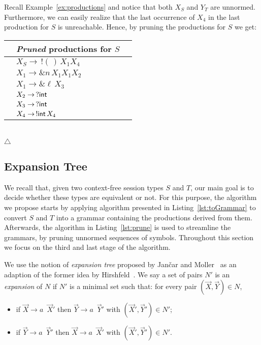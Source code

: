 \begin{example}
\label{ex:prune}
	Recall Example~\ref{ex:productions} and notice that both $X_S$ and $Y_T$ 
	are unnormed. Furthermore, we can easily realize that the last occurrence of 
	$X_4$ in the last production for $S$ is unreachable. Hence, by pruning the 
	productions for $S$ we get:\\
	
	\centering
	\begin{tabular}{l l l }
 		&\emph{Pruned} productions for $S$&  \\ \hline
 		&\hspace*{4mm}$X_S \rightarrow \,! (\,)\,X_1 X_4$ &\\
  		&\hspace*{4mm}$X_1 \rightarrow \& n\, X_1 X_1 X_2$ & \\
  		&\hspace*{4mm}$X_1 \rightarrow \& \ell\, X_3$ &\\
 		&\hspace*{4mm}$X_2 \rightarrow \,? \mathsf{int}$&\\
  		&\hspace*{4mm}$X_3 \rightarrow \,? \mathsf{int}$&\\
  		&\hspace*{4mm}$X_4 \rightarrow \,!\mathsf{int}\, X_4 $ &\\
	\end{tabular}\\
  	\hfill$\triangle$
\end{example}

\subsection{Expansion Tree}
\label{subsec:expand}

We recall that, given two context-free session types $S$ and $T$, our main goal 
is to decide whether these types are equivalent or not. For this purpose, 
the algorithm we propose starts by applying algorithm presented in
Listing~\ref{lst:toGrammar} to convert $S$ and $T$ into a grammar containing 
the productions derived from them. Afterwards, the algorithm in 
Listing~\ref{lst:prune} is used to streamline the grammars, by pruning 
unnormed sequences of symbols. Throughout this section we focus on the 
third and last stage of the algorithm.

We use the notion of \emph{expansion tree} proposed by Jan{\v{c}}ar 
and Moller~\cite{janvcar1999techniques} as an adaption of the former idea by 
Hirshfeld~\cite{hirshfeld1996bisimulation}. We say a set of pairs $N'$ is an 
\emph{expansion} of $N$ if $N'$ is a minimal set such that: for every pair 
$(\vec X, \vec Y) \in N$,
\begin{itemize}
	\item if $\vec X \rightarrow a \enspace\vec X'$ then $\vec Y \rightarrow 
		  a \enspace\vec Y'$ with $(\vec X',\vec Y')\in N'$;
	\item if $\vec Y \rightarrow a \enspace\vec Y'$ then $\vec X \rightarrow 
	      a \enspace\vec X'$ with $(\vec X',\vec Y')\in N'$.
\end{itemize}

